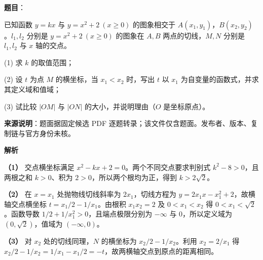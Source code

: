 \begin{answer}

\textbf{题目}：

已知函数 $y=kx$ 与 $y=x^2+2\ (x\geq 0)$ 的图象相交于 $A(x_1,y_1)$，$B(x_2,y_2)$。$l_1,l_2$ 分别是 $y=x^2+2\ (x\geq 0)$ 的图象在 $A,B$ 两点的切线，$M,N$ 分别是 $l_1,l_2$ 与 $x$ 轴的交点。

(1) 求 $k$ 的取值范围；

(2) 设 $t$ 为点 $M$ 的横坐标，当 $x_1<x_2$ 时，写出 $t$ 以 $x_1$ 为自变量的函数式，并求其定义域和值域；

(3) 试比较 $|OM|$ 与 $|ON|$ 的大小，并说明理由（$O$ 是坐标原点）。

\begin{gktip}
\textbf{来源说明}：题面据固定候选 PDF 逐题转录；该文件仅含题面。发布者、版本、复制链与官方身份未核。
\end{gktip}

\textbf{解析}

\textbf{（1）} 交点横坐标满足 $x^2-kx+2=0$。两个不同交点要求判别式 $k^2-8>0$，且两根之和 $k>0$、积为 $2>0$，所以两个根均为正，得到 $k>2\sqrt2$。

\textbf{（2）} 在 $x=x_1$ 处抛物线切线斜率为 $2x_1$，切线方程为 $y=2x_1x-x_1^2+2$，故横轴交点横坐标 $t=x_1/2-1/x_1$。由根积 $x_1x_2=2$ 及 $0<x_1<x_2$ 得 $0<x_1<\sqrt2$。函数导数 $1/2+1/x_1^2>0$，且端点极限分别为 $-\infty$ 与 $0$，所以定义域为 $(0,\sqrt2)$，值域为 $(-\infty,0)$。

\textbf{（3）} 对 $x_2$ 处的切线同理，$N$ 的横坐标为 $x_2/2-1/x_2$。利用 $x_2=2/x_1$ 得 $x_2/2-1/x_2=1/x_1-x_1/2=-t$，故两横轴交点到原点的距离相同。




\end{answer}